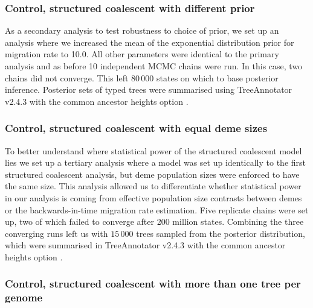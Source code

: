 \documentclass[11pt,oneside,letterpaper]{article}
\begin{document}
\subsubsection*{Control, structured coalescent with different prior}

As a secondary analysis to test robustness to choice of prior, we set up an analysis where we increased the mean of the exponential distribution prior for migration rate to 10.0.
All other parameters were identical to the primary analysis and as before 10 independent MCMC chains were run.
In this case, two chains did not converge.
This left $80\,000$ states on which to base posterior inference.
Posterior sets of typed trees were summarised using TreeAnnotator v2.4.3 with the common ancestor heights option \citep{heled_looking_2013}.

\subsubsection*{Control, structured coalescent with equal deme sizes}

To better understand where statistical power of the structured coalescent model lies we set up a tertiary analysis where a model was set up identically to the first structured coalescent analysis, but deme population sizes were enforced to have the same size.
This analysis allowed us to differentiate whether statistical power in our analysis is coming from effective population size contrasts between demes or the backwards-in-time migration rate estimation.
Five replicate chains were set up, two of which failed to converge after 200 million states.
Combining the three converging runs left us with $15\,000$ trees sampled from the posterior distribution, which were summarised in TreeAnnotator v2.4.3 with the common ancestor heights option \citep{heled_looking_2013}.

\subsubsection*{Control, structured coalescent with more than one tree per genome}
\end{document}
